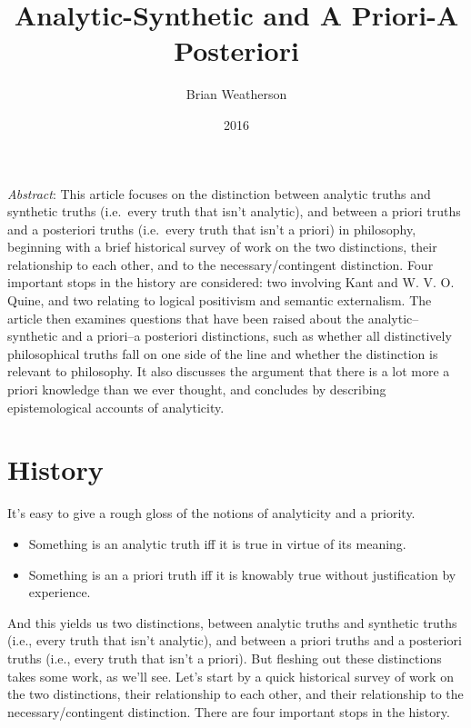 \documentclass[
  11pt,
  letterpaper,
  DIV=11,
  numbers=noendperiod,
  twoside]{scrartcl}
\title{Analytic-Synthetic and A Priori-A Posteriori}
\author{Brian Weatherson}
\date{2016}
\providecommand{\tightlist}{%
  \setlength{\itemsep}{0pt}\setlength{\parskip}{0pt}}
\renewenvironment{abstract}
 {\vspace{-1.25cm}
 \quotation\small\noindent\emph{Abstract}:}
 {\endquotation}
\renewenvironment{abstract}
 {\quotation\small\noindent\emph{Abstract}:}
 {\endquotation\vspace{-0.02cm}}
\begin{document}
\maketitle
\begin{abstract}
This article focuses on the distinction between analytic truths and
synthetic truths (i.e.~every truth that isn't analytic), and between a
priori truths and a posteriori truths (i.e.~every truth that isn't a
priori) in philosophy, beginning with a brief historical survey of work
on the two distinctions, their relationship to each other, and to the
necessary/contingent distinction. Four important stops in the history
are considered: two involving Kant and W. V. O. Quine, and two relating
to logical positivism and semantic externalism. The article then
examines questions that have been raised about the analytic--synthetic
and a priori--a posteriori distinctions, such as whether all
distinctively philosophical truths fall on one side of the line and
whether the distinction is relevant to philosophy. It also discusses the
argument that there is a lot more a priori knowledge than we ever
thought, and concludes by describing epistemological accounts of
analyticity.
\end{abstract}


\section{History}\label{history}

It's easy to give a rough gloss of the notions of analyticity and a
priority.

\begin{itemize}
\tightlist
\item
  Something is an analytic truth iff it is true in virtue of its
  meaning.
\item
  Something is an a priori truth iff it is knowably true without
  justification by experience.
\end{itemize}

And this yields us two distinctions, between analytic truths and
synthetic truths (i.e., every truth that isn't analytic), and between a
priori truths and a posteriori truths (i.e., every truth that isn't a
priori). But fleshing out these distinctions takes some work, as we'll
see. Let's start by a quick historical survey of work on the two
distinctions, their relationship to each other, and their relationship
to the necessary/contingent distinction. There are four important stops
in the history.
\end{document}
